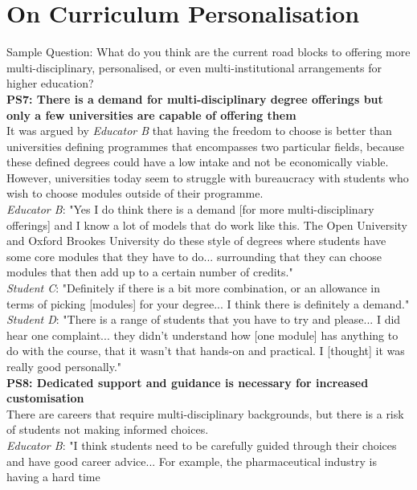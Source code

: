 \section{On Curriculum Personalisation}

Sample Question: What do you think are the current road blocks to offering more multi-disciplinary, 
personalised, or even multi-institutional arrangements for higher education?
\vspace{0.25cm}\\
\textbf{PS7: There is a demand for multi-disciplinary degree offerings but only a few 
universities are capable of offering them}\\
It was argued by \textit{Educator B} that having the freedom to choose is better than universities 
defining programmes that encompasses two particular fields, because these defined degrees could have 
a low intake and not be economically viable. However, universities today seem to struggle with bureaucracy 
with students who wish to choose modules outside of their programme.\\
\textit{Educator B}: "Yes I do think there is a demand [for more multi-disciplinary offerings] and I know 
a lot of models that do work like this. The Open University and Oxford Brookes University do these 
style of degrees where students have some core modules that they have to do... surrounding that 
they can choose modules that then add up to a certain number of credits." \\
\textit{Student C}: "Definitely if there is a bit more combination, or an allowance in terms of 
picking [modules] for your degree... I think there is definitely a demand."\\
\textit{Student D}: "There is a range of students that you have to try and please...
I did hear one complaint... they didn't understand how [one module] has anything to do with the course, 
that it wasn't that hands-on and practical. I [thought] it was really good personally."
\vspace{0.25cm}\\
\textbf{PS8: Dedicated support and guidance is necessary for increased customisation}\\
There are careers that require multi-disciplinary backgrounds, but there is a risk of 
students not making informed choices.\\
\textit{Educator B}: "I think students need to be carefully guided through their choices and 
have good career advice... For example, the pharmaceutical industry is having a hard time 
